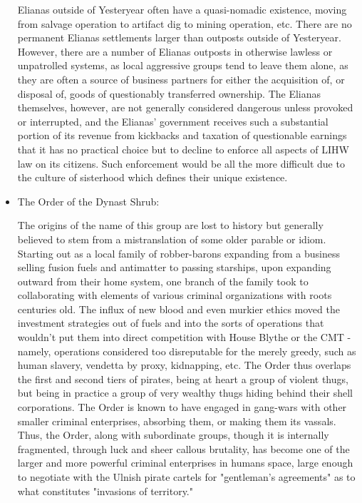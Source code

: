 \begin{itemize}
Elianas outside of Yesteryear often have a quasi-nomadic existence,
moving from salvage operation to artifact dig to mining operation,
etc. There are no permanent Elianas settlements larger than outposts
outside of Yesteryear. However, there are a number of Elianas outposts
in otherwise lawless or unpatrolled systems, as local aggressive
groups tend to leave them alone, as they are often a source of
business partners for either the acquisition of, or disposal of, goods
of questionably transferred ownership. The Elianas themselves,
however, are not generally considered dangerous unless provoked or
interrupted, and the Elianas' government receives such a substantial
portion of its revenue from kickbacks and taxation of questionable
earnings that it has no practical choice but to decline to enforce all
aspects of LIHW law on its citizens. Such enforcement would be all the
more difficult due to the culture of sisterhood which defines their
unique existence.

\item The Order of the Dynast Shrub: 

The origins of the name of this group are lost to history but
generally believed to stem from a mistranslation of some older parable
or idiom. Starting out as a local family of robber-barons expanding
from a business selling fusion fuels and antimatter to passing
starships, upon expanding outward from their home system, one branch
of the family took to collaborating with elements of various criminal
organizations with roots centuries old. The influx of new blood and
even murkier ethics moved the investment strategies out of fuels and
into the sorts of operations that wouldn't put them into direct
competition with House Blythe or the CMT - namely, operations
considered too disreputable for the merely greedy, such as human
slavery, vendetta by proxy, kidnapping, etc. The Order thus overlaps
the first and second tiers of pirates, being at heart a group of
violent thugs, but being in practice a group of very wealthy thugs
hiding behind their shell corporations. The Order is known to have
engaged in gang-wars with other smaller criminal enterprises,
absorbing them, or making them its vassals. Thus, the Order, along
with subordinate groups, though it is internally fragmented, through
luck and sheer callous brutality, has become one of the larger and
more powerful criminal enterprises in humans space, large enough to
negotiate with the Ulnish pirate cartels for "gentleman's agreements"
as to what constitutes "invasions of territory."


\end{itemize}
